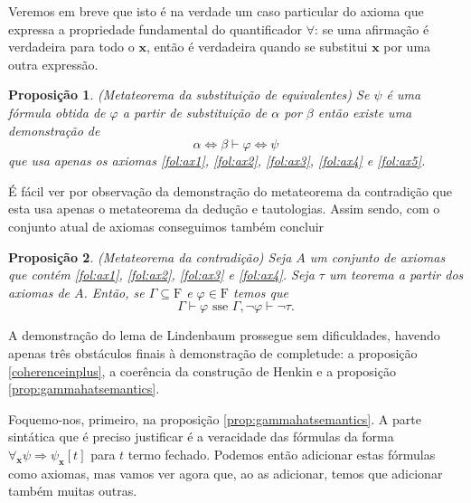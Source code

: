 \documentclass{report}
\newtheorem{prop}{Proposição}
\theoremstyle{definition}
\theoremstyle{remark}
\renewcommand{\bf}[1]{\mathbf{#1}}
\newcommand{\F}{\mathrm{F}}
\newcommand{\imply}{\mathbin{\Rightarrow}}
\newcommand{\eqv}{\mathbin{\Leftrightarrow}}
\begin{document}
	Veremos em breve que isto é na verdade um caso particular do axioma que expressa a propriedade fundamental do quantificador $\forall$: se uma afirmação é verdadeira para todo o $\bf x$, então é verdadeira quando se substitui $\bf x$ por uma outra expressão.

	\begin{prop} (Metateorema da substituição de equivalentes)
	Se $\psi$ é uma fórmula obtida de $\varphi$ a partir de substituição de $\alpha$ por $\beta$ então existe uma demonstração de
	\[\alpha \eqv \beta \vdash \varphi \eqv \psi\]
	que usa apenas os axiomas \eqref{fol:ax1}, \eqref{fol:ax2}, \eqref{fol:ax3}, \eqref{fol:ax4} e \eqref{fol:ax5}.
	\end{prop}

	É fácil ver por observação da demonstração do metateorema da contradição que esta usa apenas o metateorema da dedução e tautologias. Assim sendo, com o conjunto atual de axiomas conseguimos também concluir

	\begin{prop} (Metateorema da contradição)
	Seja $A$ um conjunto de axiomas que contém \eqref{fol:ax1}, \eqref{fol:ax2}, \eqref{fol:ax3} e \eqref{fol:ax4}. Seja $\tau$ um teorema a partir dos axiomas de $A$. Então, se $\Gamma \subseteq \F$ e $\varphi \in \F$ temos que
\[\Gamma \vdash \varphi \text{ sse } \Gamma, \neg \varphi \vdash \neg \tau.\]
	\end{prop}

	A demonstração do lema de Lindenbaum prossegue sem dificuldades, havendo apenas três obstáculos finais à demonstração de completude: a proposição \ref{coherenceinplus}, a coerência da construção de Henkin e a proposição \ref{prop:gammahatsemantics}.

	Foquemo-nos, primeiro, na proposição \ref{prop:gammahatsemantics}. A parte sintática que é preciso justificar é a veracidade das fórmulas da forma $\forall_{\bf x} \psi \imply \psi_{\bf x}[t]$ para $t$ termo fechado. Podemos então adicionar estas fórmulas como axiomas, mas vamos ver agora que, ao as adicionar, temos que adicionar também muitas outras.
\end{document}
